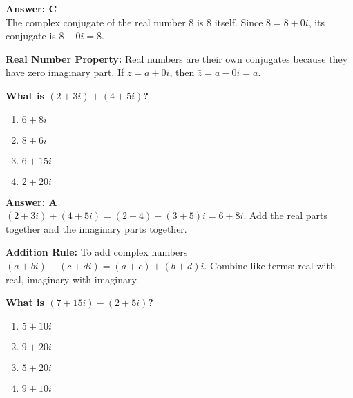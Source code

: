 \documentclass[12pt,a4paper]{article}
\begin{document}
\begin{answerstyle}
\textbf{Answer: C} \\
The complex conjugate of the real number 8 is 8 itself. Since \( 8 = 8 + 0i \), its conjugate is \( 8 - 0i = 8 \).
\end{answerstyle}

\begin{conceptbox}
\textbf{Real Number Property:} Real numbers are their own conjugates because they have zero imaginary part. If \( z = a + 0i \), then \( \bar{z} = a - 0i = a \).
\end{conceptbox}

\newpage
\begin{questiontitle}[MCQ 36]
\textbf{What is \( (2 + 3i) + (4 + 5i) \)?}
\end{questiontitle}

\begin{partbox}[Options]
\begin{enumerate}[label=\Alph*.]
    \item \( 6 + 8i \)
    \item \( 8 + 6i \)
    \item \( 6 + 15i \)
    \item \( 2 + 20i \)
\end{enumerate}
\end{partbox}

\begin{answerstyle}
\textbf{Answer: A} \\
\( (2 + 3i) + (4 + 5i) = (2 + 4) + (3 + 5)i = 6 + 8i \). Add the real parts together and the imaginary parts together.
\end{answerstyle}

\begin{conceptbox}
\textbf{Addition Rule:} To add complex numbers \( (a + bi) + (c + di) = (a + c) + (b + d)i \). Combine like terms: real with real, imaginary with imaginary.
\end{conceptbox}

\newpage
\begin{questiontitle}[MCQ 37]
\textbf{What is \( (7 + 15i) - (2 + 5i) \)?}
\end{questiontitle}

\begin{partbox}[Options]
\begin{enumerate}[label=\Alph*.]
    \item \( 5 + 10i \)
    \item \( 9 + 20i \)
    \item \( 5 + 20i \)
    \item \( 9 + 10i \)
\end{enumerate}
\end{partbox}
\end{document}
